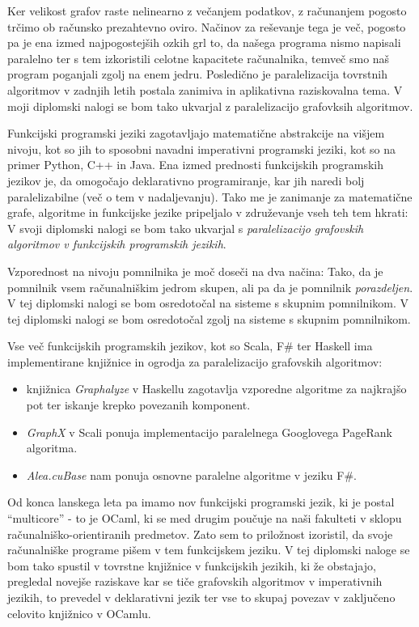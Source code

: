 \documentclass[12pt,a4paper]{amsart}
\theoremstyle{definition} %
\theoremstyle{plain} %
\begin{document}
Ker velikost grafov raste nelinearno z večanjem podatkov, z računanjem pogosto trčimo ob računsko prezahtevno oviro. Načinov za reševanje tega je več, pogosto pa je ena izmed najpogostejših ozkih grl to, da našega programa nismo napisali paralelno ter s tem izkoristili celotne kapacitete računalnika, temveč smo naš program poganjali zgolj na enem jedru. Posledično je paralelizacija tovrstnih algoritmov v zadnjih letih postala zanimiva in aplikativna raziskovalna tema. V moji diplomski nalogi se bom tako ukvarjal z paralelizacijo grafovksih algoritmov.

Funkcijski programski jeziki zagotavljajo matematične abstrakcije na višjem nivoju, kot so jih to sposobni navadni imperativni programski jeziki, kot so na primer Python, C++ in Java. Ena izmed prednosti funkcijskih programskih jezikov je, da omogočajo deklarativno programiranje, kar jih naredi bolj paralelizabilne (več o tem v nadaljevanju). Tako me je zanimanje za matematične grafe, algoritme in funkcijske jezike pripeljalo v združevanje vseh teh tem hkrati: V svoji diplomski nalogi se bom tako ukvarjal s \textit{paralelizacijo grafovskih algoritmov v funkcijskih programskih jezikih}.

Vzporednost na nivoju pomnilnika je moč doseči na dva načina: Tako, da je pomnilnik vsem računalniškim jedrom skupen, ali pa da je pomnilnik \textit{porazdeljen}. V tej diplomski nalogi se bom osredotočal na sisteme s skupnim pomnilnikom. V tej diplomski nalogi se bom osredotočal zgolj na sisteme s skupnim pomnilnikom.

Vse več funkcijskih programskih jezikov, kot so Scala, F\# ter Haskell ima implementirane knjižnice in ogrodja za paralelizacijo grafovskih algoritmov:
\begin{itemize}
    \item knjižnica \textit{Graphalyze} v Haskellu zagotavlja vzporedne algoritme za najkrajšo pot ter iskanje krepko povezanih komponent.
    \item \textit{GraphX} v Scali ponuja implementacijo paralelnega Googlovega PageRank algoritma.
    \item \textit{Alea.cuBase} nam ponuja osnovne paralelne algoritme v jeziku F\#.
\end{itemize}

Od konca lanskega leta pa imamo nov funkcijski programski jezik, ki je postal ``multicore'' - to je OCaml, ki se med drugim poučuje na naši fakulteti v sklopu računalniško-orientiranih predmetov. Zato sem to priložnost izoristil, da svoje računalniške programe pišem v tem funkcijskem jeziku. V tej diplomski naloge se bom tako spustil v tovrstne knjižnice v funkcijskih jezikih, ki že obstajajo, pregledal novejše raziskave kar se tiče grafovskih algoritmov v imperativnih jezikih, to prevedel v deklarativni jezik ter vse to skupaj povezav v zaključeno celovito knjižnico v OCamlu.
\end{document}
